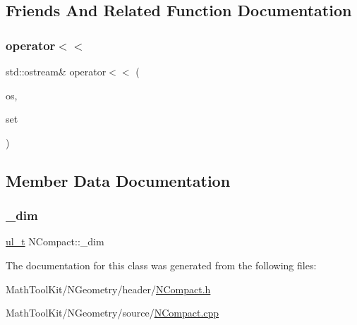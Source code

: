 \subsection{Friends And Related Function Documentation}
\mbox{\label{class_n_compact_a2afd0750c38a42e4afdc675fb8ac0221}} 
\subsubsection{\texorpdfstring{operator$<$$<$}{operator<<}}
{\footnotesize\ttfamily std\+::ostream\& operator$<$$<$ (\begin{DoxyParamCaption}\item[{std\+::ostream \&}]{os,  }\item[{const \mbox{\hyperlink{class_n_compact}{N\+Compact}} \&}]{set }\end{DoxyParamCaption})\hspace{0.3cm}{\ttfamily [friend]}}



\subsection{Member Data Documentation}
\mbox{\label{class_n_compact_a0f13086af28c4e2dbbcaa308f28ed506}} 
\subsubsection{\texorpdfstring{\_dim}{\_dim}}
{\footnotesize\ttfamily \mbox{\hyperlink{group___n_algebra_ga1b140a2034db3f5dfe18a987745df43a}{ul\+\_\+t}} N\+Compact\+::\+\_\+dim\hspace{0.3cm}{\ttfamily [protected]}}



The documentation for this class was generated from the following files\+:\begin{DoxyCompactItemize}
\item 
Math\+Tool\+Kit/\+N\+Geometry/header/\mbox{\hyperlink{_n_compact_8h}{N\+Compact.\+h}}\item 
Math\+Tool\+Kit/\+N\+Geometry/source/\mbox{\hyperlink{_n_compact_8cpp}{N\+Compact.\+cpp}}\end{DoxyCompactItemize}
